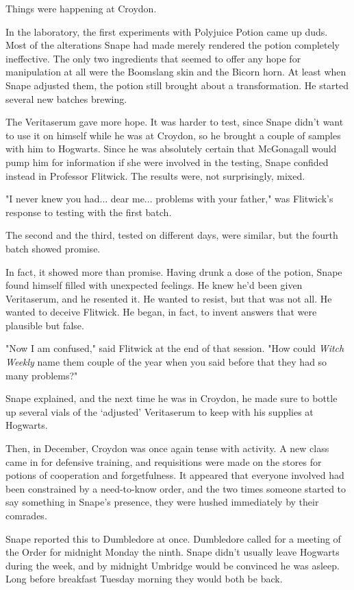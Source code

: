 Things were happening at Croydon.

In the laboratory, the first experiments with Polyjuice Potion came up duds. Most of the alterations Snape had made merely rendered the potion completely ineffective. The only two ingredients that seemed to offer any hope for manipulation at all were the Boomslang skin and the Bicorn horn. At least when Snape adjusted them, the potion still brought about a transformation. He started several new batches brewing.

The Veritaserum gave more hope. It was harder to test, since Snape didn't want to use it on himself while he was at Croydon, so he brought a couple of samples with him to Hogwarts. Since he was absolutely certain that McGonagall would pump him for information if she were involved in the testing, Snape confided instead in Professor Flitwick. The results were, not surprisingly, mixed.

"I never knew you had... dear me... problems with your father," was Flitwick's response to testing with the first batch.

The second and the third, tested on different days, were similar, but the fourth batch showed promise.

In fact, it showed more than promise. Having drunk a dose of the potion, Snape found himself filled with unexpected feelings. He knew he'd been given Veritaserum, and he resented it. He wanted to resist, but that was not all. He wanted to deceive Flitwick. He began, in fact, to invent answers that were plausible but false.

"Now I am confused," said Flitwick at the end of that session. "How could \emph{Witch Weekly} name them couple of the year when you said before that they had so many problems?"

Snape explained, and the next time he was in Croydon, he made sure to bottle up several vials of the `adjusted' Veritaserum to keep with his supplies at Hogwarts.

Then, in December, Croydon was once again tense with activity. A new class came in for defensive training, and requisitions were made on the stores for potions of cooperation and forgetfulness. It appeared that everyone involved had been constrained by a need-to-know order, and the two times someone started to say something in Snape's presence, they were hushed immediately by their comrades.

Snape reported this to Dumbledore at once. Dumbledore called for a meeting of the Order for midnight Monday the ninth. Snape didn't usually leave Hogwarts during the week, and by midnight Umbridge would be convinced he was asleep. Long before breakfast Tuesday morning they would both be back.

